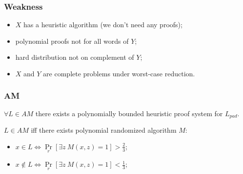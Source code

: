 \begin{frame}
	\frametitle{Weakness}

    \begin{itemize}
    	\item $X$ has a heuristic algorithm (we don't need any proofs);
    	\item polynomial proofs not for all words of $Y$;
    	\item hard distribution not on complement of $Y$;
    	\item $X$ and $Y$ are complete problems under {\color{blue}worst-case}
		    reduction.
    \end{itemize}
\end{frame}


\begin{frame}
    \frametitle{AM}
    
    \begin{theorem}
		$\forall L \in AM$ there exists a polynomially bounded heuristic proof system
        for $L_{pad}$.
    \end{theorem}


    \begin{definition}[Babai'85]
    	$L \in AM$ iff there exists polynomial randomized algorithm
        $M$:
        \begin{itemize}
			\item $x \in L \Leftrightarrow
        		\Pr\limits_{r}[\exists z~ M(x, z) = 1] 
        		> \frac{2}{3}$;
            \item $x \notin L \Leftrightarrow
        		\Pr\limits_{r}[\exists z~ M(x, z) = 1] 
        		< \frac{1}{3}$;
        \end{itemize}
    \end{definition}
    
\end{frame}

